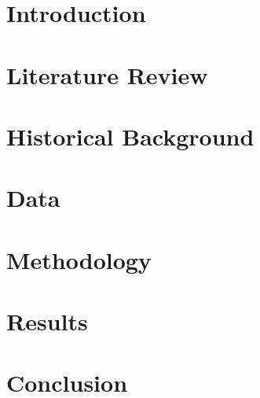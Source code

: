 
\section*{Introduction}



\newpage
\section{Literature Review} 


\newpage
\section{Historical Background}



\newpage
\section{Data}


\newpage
\section{Methodology}


\newpage
\section{Results}


\newpage

\section*{Conclusion}



